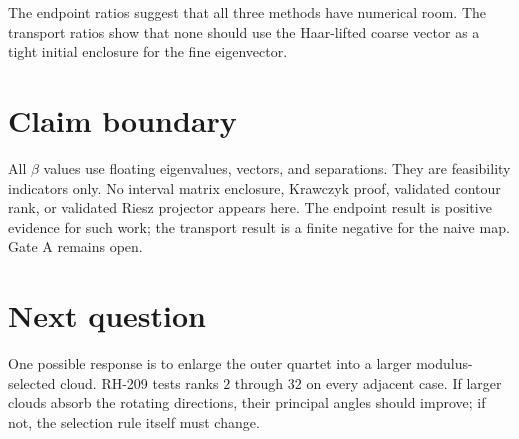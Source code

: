 \documentclass[12pt]{article}
\theoremstyle{remark}\newtheorem{remark}[theorem]{Remark}
\begin{document}
The endpoint ratios suggest that all three methods have numerical room.  The
transport ratios show that none should use the Haar-lifted coarse vector as a
tight initial enclosure for the fine eigenvector.

\section{Claim boundary}

All $\beta$ values use floating eigenvalues, vectors, and separations.  They
are feasibility indicators only.  No interval matrix enclosure, Krawczyk
proof, validated contour rank, or validated Riesz projector appears here.
The endpoint result is positive evidence for such work; the transport result
is a finite negative for the naive map.  Gate A remains open.

\section{Next question}

One possible response is to enlarge the outer quartet into a larger
modulus-selected cloud.  RH-209 tests ranks $2$ through $32$ on every
adjacent case.  If larger clouds absorb the rotating directions, their
principal angles should improve; if not, the selection rule itself must
change.


\end{document}
